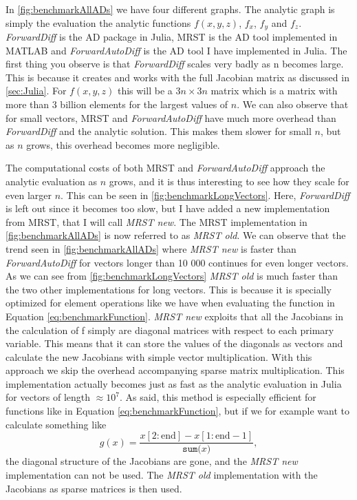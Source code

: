 In \autoref{fig:benchmarkAllADs} we have four different graphs. The analytic graph is simply the evaluation the analytic functions $f(x,y,z)$, $f_x$, $f_y$ and $f_z$. \textit{ForwardDiff} is the AD package in Julia, MRST is the AD tool implemented in MATLAB and \textit{ForwardAutoDiff} is the AD tool I have implemented in Julia. The first thing you observe is that \textit{ForwardDiff} scales very badly as n becomes large. This is because it creates and works with the full Jacobian matrix as discussed in \autoref{sec:Julia}. For $f(x,y,z)$ this will be a $3n \times 3n$ matrix which is a matrix with more than 3 billion elements for the largest values of $n$. We can also observe that for small vectors, MRST and \textit{ForwardAutoDiff} have much more overhead than \textit{ForwardDiff} and the analytic solution. This makes them slower for small $n$, but as $n$ grows, this overhead becomes more negligible. 

The computational costs of both MRST and \textit{ForwardAutoDiff} approach the analytic evaluation as $n$ grows, and it is thus interesting to see how they scale for even larger $n$. This can be seen in \autoref{fig:benchmarkLongVectors}. Here, \textit{ForwardDiff} is left out since it becomes too slow, but I have added a new implementation from MRST, that I will call \textit{MRST new}. The MRST implementation in  \autoref{fig:benchmarkAllADs} is now referred to as \textit{MRST old}. We can observe that the trend seen in \autoref{fig:benchmarkAllADs} where \textit{MRST new} is faster than \textit{ForwardAutoDiff} for vectors longer than 10 000 continues for even longer vectors. As we can see from \autoref{fig:benchmarkLongVectors} \textit{MRST old} is much faster than the two other implementations for long vectors. This is because it is specially optimized for element operations like we have when evaluating the function in Equation \eqref{eq:benchmarkFunction}. \textit{MRST new} exploits that all the Jacobians in the calculation of f simply are diagonal matrices with respect to each primary variable. This means that it can store the values of the diagonals as vectors and calculate the new Jacobians with simple vector multiplication. With this approach we skip the overhead accompanying sparse matrix multiplication. This implementation actually becomes just as fast as the analytic evaluation in Julia for vectors of length $\approx 10^7$. As said, this method is especially efficient for functions like in Equation \eqref{eq:benchmarkFunction}, but if we for example want to calculate something like
\begin{equation}
g(x) = \frac{x\left[2:\text{end}\right] - x\left[1:\text{end}-1\right]}{\texttt{sum(}x\texttt{)}},
\label{eq:differenceFunction}
\end{equation}
the diagonal structure of the Jacobians are gone, and the \textit{MRST new} implementation can not be used. The \textit{MRST old} implementation with the Jacobians as sparse matrices is then used. 

